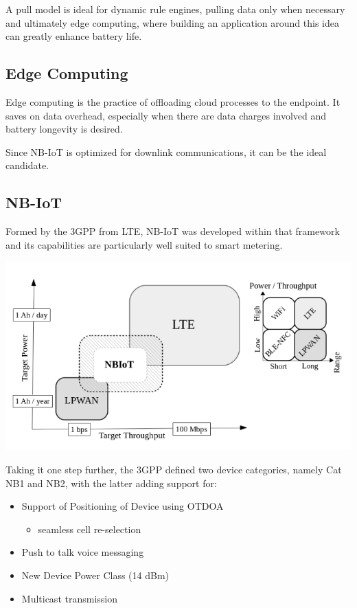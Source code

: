 \documentclass[]{article}
\providecommand{\tightlist}{%
  \setlength{\itemsep}{0pt}\setlength{\parskip}{0pt}}
\let\origfigure\figure
\let\endorigfigure\endfigure
\renewenvironment{figure}[1][2] {
    \expandafter\origfigure\expandafter[H]
} {
    \endorigfigure
}
\begin{document}
A pull model is ideal for dynamic rule engines, pulling data only when
necessary and ultimately edge computing, where building an application
around this idea can greatly enhance battery life.

\hypertarget{edge-computing}{%
\subsection{Edge Computing}\label{edge-computing}}

Edge computing is the practice of offloading cloud processes to the
endpoint. It saves on data overhead, especially when there are data
charges involved and battery longevity is desired.

Since NB-IoT is optimized for downlink communications, it can be the
ideal candidate.

\hypertarget{nbiot}{%
\subsection{NB-IoT}\label{nbiot}}

Formed by the 3GPP from LTE, NB-IoT was developed within that framework
and its capabilities are particularly well suited to smart metering.

\begin{figure}
\centering
\includegraphics{../images/1559246290186.png}
\caption{IoT Market representation
{[}\protect\hyperlink{ref-Martinez2019}{2}{]}}
\end{figure}

Taking it one step further, the 3GPP defined two device categories,
namely Cat NB1 and NB2, with the latter adding support for:

\begin{itemize}
\tightlist
\item
  Support of Positioning of Device using OTDOA

  \begin{itemize}
  \tightlist
  \item
    seamless cell re-selection
  \end{itemize}
\item
  Push to talk voice messaging
\item
  New Device Power Class (14 dBm)
\item
  Multicast transmission
\end{itemize}
\end{document}
